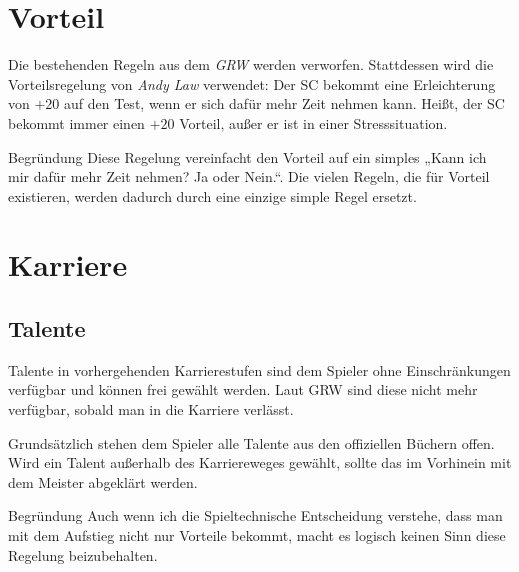 \documentclass[a4paper,10pt,twoside,twocolumn,openany,nodeprecatedcode,bg=print]{dndbook}
\begin{document}

\section{Vorteil}
Die bestehenden Regeln aus dem \textit{GRW} werden verworfen.
Stattdessen wird die Vorteilsregelung von \textit{Andy Law} verwendet: Der SC bekommt eine Erleichterung von $+20$ auf den Test, wenn er sich dafür mehr Zeit nehmen kann. Heißt, der SC bekommt immer einen $+20$ Vorteil, außer er ist in einer Stresssituation.

\begin{DndComment}{Begründung}
  Diese Regelung vereinfacht den Vorteil auf ein simples „Kann ich mir dafür mehr Zeit nehmen? Ja oder Nein.“. Die vielen Regeln, die für Vorteil existieren, werden dadurch durch eine einzige simple Regel ersetzt.
\end{DndComment}


\vspace{\fill}
\pagebreak

\section{Karriere}
\subsection{Talente}
Talente in vorhergehenden Karrierestufen sind dem Spieler ohne Einschränkungen verfügbar und können frei gewählt werden.
Laut GRW sind diese nicht mehr verfügbar, sobald man in die Karriere verlässt.

Grundsätzlich stehen dem Spieler alle Talente aus den offiziellen Büchern offen. 
Wird ein Talent außerhalb des Karriereweges gewählt, sollte das im Vorhinein mit dem Meister abgeklärt werden.

\begin{DndComment}{Begründung}
  Auch wenn ich die Spieltechnische Entscheidung verstehe, dass man mit dem Aufstieg nicht nur Vorteile bekommt, macht es logisch keinen Sinn diese Regelung beizubehalten.
\end{DndComment}
\end{document}
